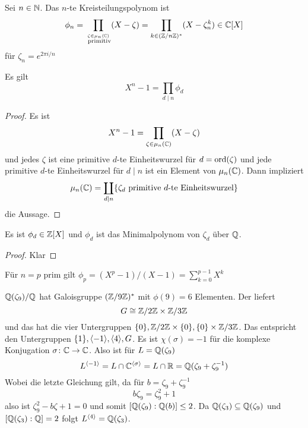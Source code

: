 \begin{Def}
    Sei \(n\in\mathbb{N}\). Das \(n\)-te Kreisteilungspolynom ist \[\phi_n=\prod_{\stackrel{\zeta\in\mu_n(\mathbb{C})}{\text{ primitiv}}}(X-\zeta)=\prod_{k\in(\mathbb{Z}/n\mathbb{Z})^*}(X-\zeta_n^k)\in\mathbb{C}[X]\] für \(\zeta_n=e^{2\pi i/n}\)
\end{Def}
\begin{Lemma}
Es gilt    \[X^n-1=\prod_{d\mid n}\phi_d\]
\end{Lemma}
\begin{proof}
   Es ist \[X^n-1=\prod_{\zeta\in\mu_n(\mathbb{C})}(X-\zeta)\] und jedes \(\zeta\) ist eine primitive \(d\)-te Einheitswurzel für \(d=\operatorname{ord}(\zeta)\) und jede primitive \(d\)-te Einheitswurzel für \(d\mid n\) ist ein Element von \(\mu_n(\mathbb{C})\).
    Dann impliziert \[\mu_n(\mathbb{C})=\coprod_{d\mid n}\{\zeta_d \text{ primitive \(d\)-te Einheitswurzel}\}\] die Aussage.
\end{proof}
\begin{Lemma}
 Es ist \(\phi_d\in\mathbb{Z}[X]\) und \(\phi_d\) ist das Minimalpolynom von \(\zeta_d\) über \(\mathbb{Q}\).
\end{Lemma}
\begin{proof}
    Klar
\end{proof}
\begin{Bem}
    Für \(n=p\) prim gilt \(\phi_p=(X^p-1)/(X-1)=\sum\limits_{k=0}^{p-1}X^k\)
\end{Bem}
\begin{Bsp}
    \(\mathbb{Q}(\zeta_9)/\mathbb{Q}\) hat Galoisgruppe \((\mathbb{Z}/9\mathbb{Z})^*\) mit \(\phi(9)=6\) Elementen. Der  liefert \[G\cong \mathbb{Z}/2\mathbb{Z}\times \mathbb{Z}/3\mathbb{Z}\] und das hat die vier Untergruppen \(\{0\},\mathbb{Z}/2\mathbb{Z}\times\{0\}, \{0\}\times\mathbb{Z}/3\mathbb{Z}\).
    Das entspricht den Untergruppen \(\{1\}, \langle-1\rangle, \langle 4\rangle,G\).
    Es ist \(\chi(\sigma)=-1\) für die komplexe Konjugation \(\sigma\colon\mathbb{C}\to\mathbb{C}\). Also ist für \(L=\mathbb{Q}(\zeta_9)\)
    \[L^{\langle -1\rangle}=L\cap \mathbb{C}^{\langle \sigma\rangle}=L\cap\mathbb{R}=\mathbb{Q}(\zeta_9+\zeta_9^{-1})\]
    Wobei die letzte Gleichung gilt, da für \(b=\zeta_9+\zeta_9^{-1}\)
    \[b\zeta_9=\zeta_9^2+1\] also ist \(\zeta_9^2-b\zeta+1=0\) und somit \([\mathbb{Q}(\zeta_9):\mathbb{Q}(b)]\leq 2\).
    Da \(\mathbb{Q}(\zeta_3)\subseteq \mathbb{Q}(\zeta_9)\) und \([\mathbb{Q}(\zeta_3):\mathbb{Q}]=2\) folgt \(L^{\langle 4\rangle}=\mathbb{Q}(\zeta_3)\).
\end{Bsp}
